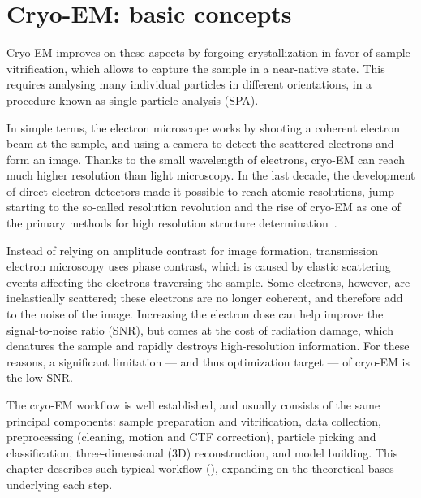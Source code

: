 \localtableofcontents

\section{Cryo-EM: basic concepts}

Cryo-EM improves on these aspects by forgoing crystallization in favor of sample vitrification, which allows to capture the sample in a near-native state. This requires analysing many individual particles in different orientations, in a procedure known as single particle analysis (SPA).

In simple terms, the electron microscope works by shooting a coherent electron beam at the sample, and using a camera to detect the scattered electrons and form an image.
Thanks to the small wavelength of electrons, cryo-EM can reach much higher resolution than light microscopy.
In the last decade, the development of direct electron detectors made it possible to reach atomic resolutions, jump-starting to the so-called resolution revolution and the rise of cryo-EM as one of the primary methods for high resolution structure determination~\cite{faruqiCCDDetectorsHighresolution2000}.

Instead of relying on amplitude contrast for image formation, transmission electron microscopy uses phase contrast, which is caused by elastic scattering events affecting the electrons traversing the sample.
Some electrons, however, are inelastically scattered; these electrons are no longer coherent, and therefore add to the noise of the image.
Increasing the electron dose can help improve the signal-to-noise ratio (SNR), but comes at the cost of radiation damage, which denatures the sample and rapidly destroys high-resolution information.
For these reasons, a significant limitation --- and thus optimization target --- of cryo-EM is the low SNR.

The cryo-EM workflow is well established, and usually consists of the same principal components: sample preparation and vitrification, data collection, preprocessing (cleaning, motion and CTF correction), particle picking and classification, three-dimensional (3D) reconstruction, and model building.
This chapter describes such typical workflow (), expanding on the theoretical bases underlying each step.

